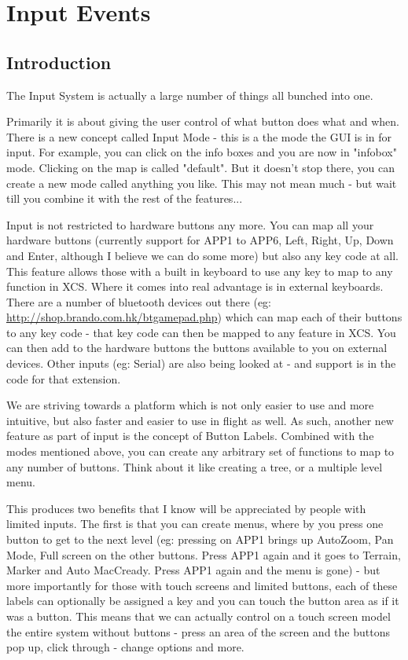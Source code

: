\section{Input Events}

\subsection{Introduction}

The Input System is actually a large number of things all bunched into one.

Primarily it is about giving the user control of what button does what
and when. There is a new concept called Input Mode - this is a the
mode the GUI is in for input. For example, you can click on the info
boxes and you are now in "infobox" mode. Clicking on the map is called
"default". But it doesn't stop there, you can create a new mode called
anything you like. This may not mean much - but wait till you combine
it with the rest of the features...

Input is not restricted to hardware buttons any more. You can map all
your hardware buttons (currently support for APP1 to APP6, Left,
Right, Up, Down and Enter, although I believe we can do some more) but
also any key code at all. This feature allows those with a built in
keyboard to use any key to map to any function in XCS. Where it comes
into real advantage is in external keyboards. There are a number of
bluetooth devices out there (eg: \url{http://shop.brando.com.hk/btgamepad.php}) 
which can map each of their
buttons to any key code - that key code can then be mapped to any
feature in XCS. You can then add to the hardware buttons the buttons
available to you on external devices. Other inputs (eg: Serial) are
also being looked at - and support is in the code for that extension.

We are striving towards a platform which is not only easier to use and
more intuitive, but also faster and easier to use in flight as
well. As such, another new feature as part of input is the concept of
Button Labels. Combined with the modes mentioned above, you can create
any arbitrary set of functions to map to any number of buttons. Think
about it like creating a tree, or a multiple level menu.

This produces two benefits that I know will be appreciated by people
with limited inputs. The first is that you can create menus, where by
you press one button to get to the next level (eg: pressing on APP1
brings up AutoZoom, Pan Mode, Full screen on the other buttons. Press
APP1 again and it goes to Terrain, Marker and Auto MacCready. Press
APP1 again and the menu is gone) - but more importantly for those with
touch screens and limited buttons, each of these labels can optionally
be assigned a key and you can touch the button area as if it was a
button.  This means that we can actually control on a touch screen
model the entire system without buttons - press an area of the screen
and the buttons pop up, click through - change options and more.

